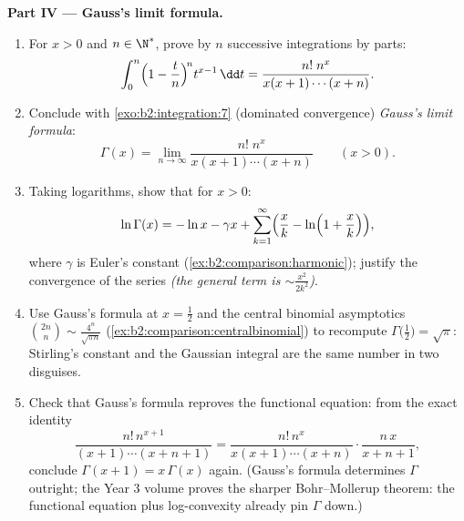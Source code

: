 \begin{problem}
\medskip
\noindent\textbf{Part IV --- Gauss's limit formula.}
\begin{enumerate}[resume]
  \item For $x > 0$ and $n \in \N^*$, prove by $n$ successive
        integrations by parts:
        \[
        \int_0^n \Bigl(1 - \frac tn\Bigr)^{\!n} t^{x-1}\,\dd t
        = \frac{n!\;n^x}{x(x+1)\cdots(x+n)} .
        \]
  \item Conclude with \cref{exo:b2:integration:7} (dominated
        convergence) \emph{Gauss's limit formula}:
        \[
        \Gamma(x) = \lim_{n\to\infty}
        \frac{n!\;n^x}{x(x+1)\cdots(x+n)}
        \qquad (x > 0).
        \]
  \item Taking logarithms, show that for $x > 0$:
        \[
        \ln\Gamma(x) = -\ln x - \gamma x +
        \sum_{k=1}^{\infty}\Bigl(\frac xk -
        \ln\Bigl(1 + \frac xk\Bigr)\Bigr),
        \]
        where $\gamma$ is Euler's constant
        (\cref{ex:b2:comparison:harmonic}); justify the
        convergence of the series \emph{(the general term is
        $\sim \frac{x^2}{2k^2}$)}.
  \item Use Gauss's formula at $x = \frac12$ and the central
        binomial asymptotics $\binom{2n}{n} \sim
        \frac{4^n}{\sqrt{\pi n}}$
        (\cref{ex:b2:comparison:centralbinomial}) to recompute
        $\Gamma\bigl(\frac12\bigr) = \sqrt\pi$: Stirling's
        constant and the Gaussian integral are the same number
        in two disguises.
  \item Check that Gauss's formula reproves the functional
        equation: from the exact identity
        \[
        \frac{n!\,n^{x+1}}{(x+1)\cdots(x+n+1)}
        = \frac{n!\,n^{x}}{x(x+1)\cdots(x+n)}\cdot
        \frac{n\,x}{x+n+1},
        \]
        conclude $\Gamma(x+1) = x\,\Gamma(x)$ again. (Gauss's
        formula determines $\Gamma$ outright; the Year 3 volume
        proves the sharper Bohr--Mollerup theorem: the
        functional equation plus log-convexity already pin
        $\Gamma$ down.)
\end{enumerate}


\end{problem}
